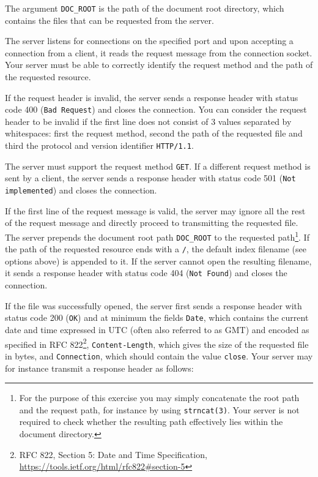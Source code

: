 The argument \verb|DOC_ROOT| is the path of the document root directory,
which contains the files that can be requested from the server.

The server listens for connections on the specified port
and upon accepting a connection from a client,
it reads the request message from the connection socket.
Your server must be able to correctly identify the request method
and the path of the requested resource.

If the request header is invalid,
the server sends a response header with status code 400 (\verb|Bad Request|)
and closes the connection.
You can consider the request header to be invalid
if the first line does not consist of 3 values separated by whitespaces:
first the request method, second the path of the requested file
and third the protocol and version identifier \verb|HTTP/1.1|.

The server must support the request method \texttt{GET}.
If a different request method is sent by a client,
the server sends a response header with status code 501 (\verb|Not implemented|)
and closes the connection.

If the first line of the request message is valid,
the server may ignore all the rest of the request message
and directly proceed to transmitting the requested file.
The server prepends the document root path \verb|DOC_ROOT|
to the requested path\footnote{
For the purpose of this exercise you may simply concatenate the
root path and the request path, for instance by using \texttt{strncat(3)}.
Your server is not required to check whether the resulting path
effectively lies within the document directory.
}.
If the path of the requested resource ends with a \verb|/|,
the default index filename (see options above) is appended to it.
If the server cannot open the resulting filename,
it sends a response header with status code 404 (\verb|Not Found|)
and closes the connection.

If the file was successfully opened,
the server first sends a response header with status code 200 (\verb|OK|)
and at minimum the fields
\verb|Date|, which contains the current date and time
expressed in UTC (often also referred to as GMT)
and encoded as specified in RFC 822\footnote{RFC 822,
Section 5: Date and Time Specification,
\url{https://tools.ietf.org/html/rfc822\#section-5}},
\verb|Content-Length|, which gives the size of the requested file in bytes,
and \verb|Connection|, which should contain the value \verb|close|.
Your server may for instance transmit a response header as follows:

